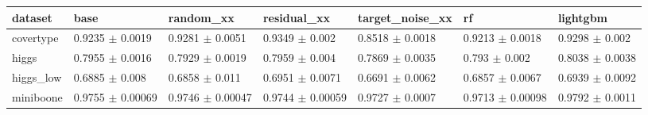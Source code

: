 \begin{tabular}{lllllll}
\toprule
dataset & base & random\_xx & residual\_xx & target\_noise\_xx & rf & lightgbm \\
\midrule
covertype & 0.9235 $\pm$ 0.0019 & 0.9281 $\pm$ 0.0051 & 0.9349 $\pm$ 0.002 & 0.8518 $\pm$ 0.0018 & 0.9213 $\pm$ 0.0018 & 0.9298 $\pm$ 0.002 \\
higgs & 0.7955 $\pm$ 0.0016 & 0.7929 $\pm$ 0.0019 & 0.7959 $\pm$ 0.004 & 0.7869 $\pm$ 0.0035 & 0.793 $\pm$ 0.002 & 0.8038 $\pm$ 0.0038 \\
higgs\_low & 0.6885 $\pm$ 0.008 & 0.6858 $\pm$ 0.011 & 0.6951 $\pm$ 0.0071 & 0.6691 $\pm$ 0.0062 & 0.6857 $\pm$ 0.0067 & 0.6939 $\pm$ 0.0092 \\
miniboone & 0.9755 $\pm$ 0.00069 & 0.9746 $\pm$ 0.00047 & 0.9744 $\pm$ 0.00059 & 0.9727 $\pm$ 0.0007 & 0.9713 $\pm$ 0.00098 & 0.9792 $\pm$ 0.0011 \\
\bottomrule
\end{tabular}
